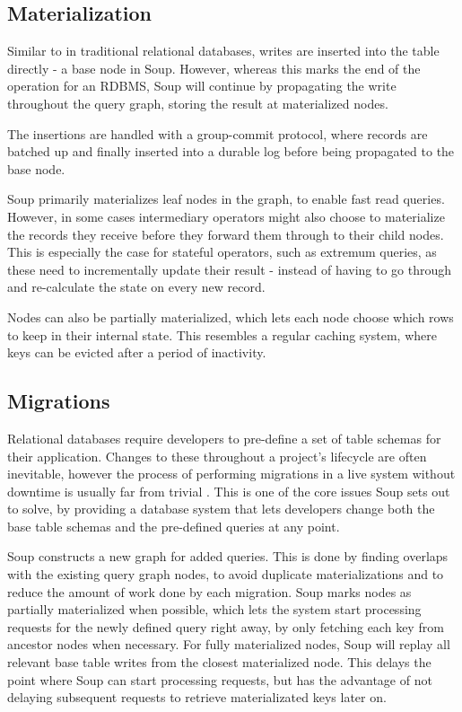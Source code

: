 \documentclass[b5paper,twoside]{report}
\begin{document}
\subsection{Materialization}
Similar to in traditional relational databases, writes are inserted into the
table directly - a base node in Soup. However, whereas this marks the
end of the operation for an RDBMS, Soup will continue by propagating the write
throughout the query graph, storing the result at materialized nodes.

The insertions are handled with a group-commit protocol, where records are
batched up and finally inserted into a durable log before being propagated to
the base node.

Soup primarily materializes leaf nodes in the graph, to enable fast read
queries. However, in some cases intermediary operators might also choose to
materialize the records they receive before they forward them through to their
child nodes. This is especially the case for stateful operators, such as
extremum queries, as these need to incrementally update their result - instead
of having to go through and re-calculate the state on every new record.

Nodes can also be partially materialized, which lets each node choose which rows
to keep in their internal state. This resembles a regular caching system, where
keys can be evicted after a period of inactivity.

\subsection{Migrations}
Relational databases require developers to pre-define a set of table schemas for
their application. Changes to these throughout a project's lifecycle are often
inevitable, however the process of performing migrations in a live
system without downtime is usually far from trivial \cite{stripe}. This is one
of the core issues Soup sets out to solve, by providing a database system that
lets developers change both the base table schemas and the pre-defined queries
at any point.

Soup constructs a new graph for added queries. This is done by finding overlaps
with the existing query graph nodes, to avoid duplicate materializations and
to reduce the amount of work done by each migration. Soup marks nodes as
partially materialized when possible, which lets the system start processing
requests for the newly defined query right away, by only fetching each key from
ancestor nodes when necessary. For fully materialized nodes, Soup will replay
all relevant base table writes from the closest materialized node. This
delays the point where Soup can start processing requests, but has the advantage
of not delaying subsequent requests to retrieve materializated keys later on.
\end{document}
